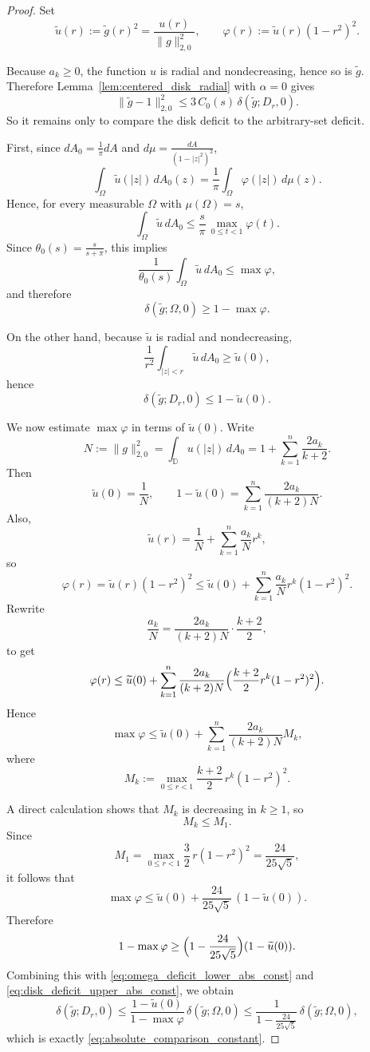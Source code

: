 \documentclass[a4paper,10pt]{amsart}
\newcommand{\D}{\mathbb{D}}
\begin{document}
\begin{proof}
Set
\[
\widetilde u(r):=\widetilde g(r)^2=\frac{u(r)}{\|g\|_{2,0}^2},
\qquad
\varphi(r):=\widetilde u(r)(1-r^2)^2.
\]

Because $a_k\ge 0$, the function $u$ is radial and nondecreasing, hence so is $\widetilde g$.
Therefore Lemma~\ref{lem:centered_disk_radial} with $\alpha=0$ gives
\begin{equation}\label{eq:disk_radial_step_abs_const}
\|\widetilde g-1\|_{2,0}^2
\le
3\,C_0(s)\,\delta(\widetilde g;D_r,0).
\end{equation}
So it remains only to compare the disk deficit to the arbitrary-set deficit.

First, since $dA_0=\frac1\pi dA$ and $d\mu=\frac{dA}{(1-|z|^2)^2}$,
\[
\int_\Omega \widetilde u(|z|)\,dA_0(z)
=
\frac1\pi\int_\Omega \varphi(|z|)\,d\mu(z).
\]
Hence, for every measurable $\Omega$ with $\mu(\Omega)=s$,
\[
\int_\Omega \widetilde u\,dA_0
\le
\frac{s}{\pi}\,\max_{0\le t<1}\varphi(t).
\]
Since $\theta_0(s)=\frac{s}{s+\pi}$, this implies
\[
\frac{1}{\theta_0(s)}\int_\Omega \widetilde u\,dA_0
\le
\max\varphi,
\]
and therefore
\begin{equation}\label{eq:omega_deficit_lower_abs_const}
\delta(\widetilde g;\Omega,0)\ge 1-\max\varphi.
\end{equation}

On the other hand, because $\widetilde u$ is radial and nondecreasing,
\[
\frac{1}{r^2}\int_{|z|<r}\widetilde u\,dA_0 \ge \widetilde u(0),
\]
hence
\begin{equation}\label{eq:disk_deficit_upper_abs_const}
\delta(\widetilde g;D_r,0)\le 1-\widetilde u(0).
\end{equation}

We now estimate $\max\varphi$ in terms of $\widetilde u(0)$.
Write
\[
N:=\|g\|_{2,0}^2
=
\int_\D u(|z|)\,dA_0
=
1+\sum_{k=1}^n \frac{2a_k}{k+2}.
\]
Then
\[
\widetilde u(0)=\frac1N,
\qquad
1-\widetilde u(0)=\sum_{k=1}^n \frac{2a_k}{(k+2)N}.
\]
Also,
\[
\widetilde u(r)=\frac1N+\sum_{k=1}^n \frac{a_k}{N}r^k,
\]
so
\[
\varphi(r)
=
\widetilde u(r)(1-r^2)^2
\le
\widetilde u(0)+\sum_{k=1}^n \frac{a_k}{N}r^k(1-r^2)^2.
\]
Rewrite
\[
\frac{a_k}{N}
=
\frac{2a_k}{(k+2)N}\cdot \frac{k+2}{2},
\]
to get
\[
\varphi(r)
\le
\widetilde u(0)
+
\sum_{k=1}^n \frac{2a_k}{(k+2)N}
\Bigl(\frac{k+2}{2}r^k(1-r^2)^2\Bigr).
\]
Hence
\[
\max\varphi
\le
\widetilde u(0)
+
\sum_{k=1}^n \frac{2a_k}{(k+2)N} M_k,
\]
where
\[
M_k:=\max_{0\le r<1}\frac{k+2}{2}\,r^k(1-r^2)^2.
\]

A direct calculation shows that $M_k$ is decreasing in $k\ge 1$, so
\[
M_k\le M_1.
\]
Since
\[
M_1=\max_{0\le r<1}\frac32\,r(1-r^2)^2
=\frac{24}{25\sqrt5},
\]
it follows that
\[
\max\varphi
\le
\widetilde u(0)+\frac{24}{25\sqrt5}\,(1-\widetilde u(0)).
\]
Therefore
\[
1-\max\varphi
\ge
\Bigl(1-\frac{24}{25\sqrt5}\Bigr)(1-\widetilde u(0)).
\]
Combining this with \eqref{eq:omega_deficit_lower_abs_const} and
\eqref{eq:disk_deficit_upper_abs_const}, we obtain
\[
\delta(\widetilde g;D_r,0)
\le
\frac{1-\widetilde u(0)}{1-\max\varphi}\,
\delta(\widetilde g;\Omega,0)
\le
\frac{1}{1-\frac{24}{25\sqrt5}}\,
\delta(\widetilde g;\Omega,0),
\]
which is exactly \eqref{eq:absolute_comparison_constant}.


\end{proof}
\end{document}
